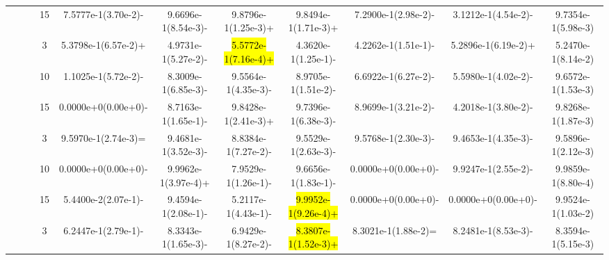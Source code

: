 \documentclass[a4paper,fleqn]{cas-dc}
\newcommand{\highlight}[1]{
	\begingroup
	\sethlcolor{Seashell}%
	\hl{#1}%
	\endgroup
}
\begin{document}
\begin{sloppypar}
\begin{table}[ht]
{\begin{tabular}{cccccccccc}
					\multirow{9}{*}{~}&\multirow{3}{*}{~} &15 &7.5777e-1(3.70e-2)- &9.6696e-1(8.54e-3)-	&9.8796e-1(1.25e-3)+	&9.8494e-1(1.71e-3)+	&7.2900e-1(2.98e-2)-	&3.1212e-1(4.54e-2)-	&9.7354e-1(5.98e-3)\\
					
					
					
					\multirow{9}{*}{~}&\multirow{3}{*}{MaF5} &3 &5.3798e-1(6.57e-2)+ &4.9731e-1(5.27e-2)-	&\highlight{5.5772e-1(7.16e-4)+}	&4.3620e-1(1.25e-1)-	&4.2262e-1(1.51e-1)-	&5.2896e-1(6.19e-2)+	&5.2470e-1(8.14e-2)
					\\
					
					\multirow{9}{*}{~}&\multirow{3}{*}{~} &10 &1.1025e-1(5.72e-2)- &8.3009e-1(6.85e-3)-	&9.5564e-1(4.35e-3)-	&8.9705e-1(1.51e-2)-	&6.6922e-1(6.27e-2)-	&5.5980e-1(4.02e-2)-	&9.6572e-1(1.53e-3)\\
					
					\multirow{9}{*}{~}&\multirow{3}{*}{~} &15 &0.0000e+0(0.00e+0)-	&8.7163e-1(1.65e-1)-	&9.8428e-1(2.41e-3)+	&9.7396e-1(6.38e-3)-	&8.9699e-1(3.21e-2)-	&4.2018e-1(3.80e-2)-	&9.8268e-1(1.87e-3)\\
					
					
					
					
					
					
					
					
					\midrule[0.35pt]
					\multirow{9}{*}{Outlier}&\multirow{3}{*}{MaF3} &3 &9.5970e-1(2.74e-3)= &9.4681e-1(3.52e-3)-	&8.8384e-1(7.27e-2)-	&9.5529e-1(2.63e-3)-	&9.5768e-1(2.30e-3)-	&9.4653e-1(4.35e-3)-	&9.5896e-1(2.12e-3)\\ 
					
					\multirow{9}{*}{~}&\multirow{3}{*}{~} &10   &0.0000e+0(0.00e+0)-	&9.9962e-1(3.97e-4)+	&7.9529e-1(1.26e-1)-	&9.6656e-1(1.83e-1)-	&0.0000e+0(0.00e+0)-	&9.9247e-1(2.55e-2)-	&9.9859e-1(8.80e-4)\\
					
					\multirow{9}{*}{~}&\multirow{3}{*}{~} &15 &5.4400e-2(2.07e-1)-	&9.4594e-1(2.08e-1)-	&5.2117e-1(4.43e-1)-	&\highlight{9.9952e-1(9.26e-4)+}	&0.0000e+0(0.00e+0)-	&0.0000e+0(0.00e+0)-	&9.9524e-1(1.03e-2)\\
					
					
					
					
					
					
					\multirow{9}{*}{~}&\multirow{3}{*}{MaF9} &3 &6.2447e-1(2.79e-1)- &8.3343e-1(1.65e-3)-	&6.9429e-1(8.27e-2)-	&\highlight{8.3807e-1(1.52e-3)+}	&8.3021e-1(1.88e-2)=	&8.2481e-1(8.53e-3)-	&8.3594e-1(5.15e-3)\\ 
					

\end{tabular}}
\end{table}
\end{sloppypar}
\end{document}
